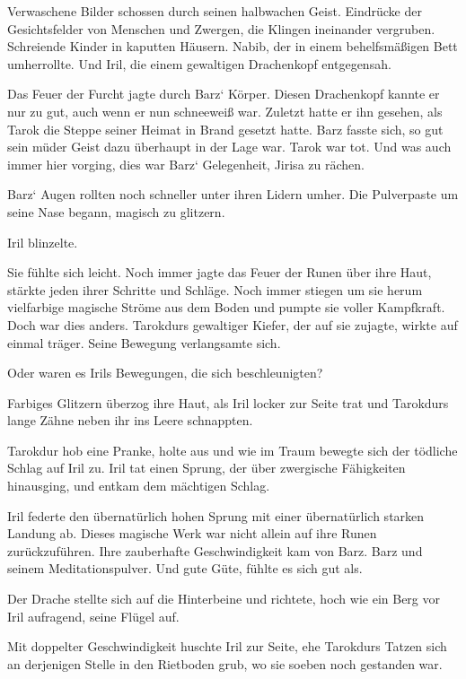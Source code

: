 Verwaschene Bilder schossen durch seinen halbwachen Geist. Eindrücke der Gesichtsfelder von Menschen und Zwergen, die Klingen ineinander vergruben. Schreiende Kinder in kaputten Häusern. Nabib, der in einem behelfsmäßigen Bett umherrollte. Und Iril, die einem gewaltigen Drachenkopf entgegensah.

Das Feuer der Furcht jagte durch Barz‘ Körper. Diesen Drachenkopf kannte er nur zu gut, auch wenn er nun schneeweiß war. Zuletzt hatte er ihn gesehen, als Tarok die Steppe seiner Heimat in Brand gesetzt hatte. Barz fasste sich, so gut sein müder Geist dazu überhaupt in der Lage war. Tarok war tot. Und was auch immer hier vorging, dies war Barz‘ Gelegenheit, Jirisa zu rächen.

Barz‘ Augen rollten noch schneller unter ihren Lidern umher. Die Pulverpaste um seine Nase begann, magisch zu glitzern.



\trennzeichen



Iril blinzelte.

Sie fühlte sich leicht. Noch immer jagte das Feuer der Runen über ihre Haut, stärkte jeden ihrer Schritte und Schläge. Noch immer stiegen um sie herum vielfarbige magische Ströme aus dem Boden und pumpte sie voller Kampfkraft. Doch war dies anders. Tarokdurs gewaltiger Kiefer, der auf sie zujagte, wirkte auf einmal träger. Seine Bewegung verlangsamte sich.

Oder waren es Irils Bewegungen, die sich beschleunigten?

Farbiges Glitzern überzog ihre Haut, als Iril locker zur Seite trat und Tarokdurs lange Zähne neben ihr ins Leere schnappten.

Tarokdur hob eine Pranke, holte aus und wie im Traum bewegte sich der tödliche Schlag auf Iril zu. Iril tat einen Sprung, der über zwergische Fähigkeiten hinausging, und entkam dem mächtigen Schlag.

Iril federte den übernatürlich hohen Sprung mit einer übernatürlich starken Landung ab. Dieses magische Werk war nicht allein auf ihre Runen zurückzuführen. Ihre zauberhafte Geschwindigkeit kam von Barz. Barz und seinem Meditationspulver. Und gute Güte, fühlte es sich gut als.

Der Drache stellte sich auf die Hinterbeine und richtete, hoch wie ein Berg vor Iril aufragend, seine Flügel auf.

Mit doppelter Geschwindigkeit huschte Iril zur Seite, ehe Tarokdurs Tatzen sich an derjenigen Stelle in den Rietboden grub, wo sie soeben noch gestanden war.

